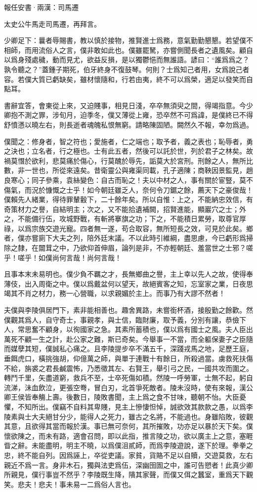 \documentclass[12pt,a4paper]{ctexbook}
\begin{document}
報任安書·兩漢：司馬遷 \par
太史公牛馬走司馬遷，再拜言。\par
少卿足下：曩者辱賜書，教以慎於接物，推賢進士爲務，意氣勤勤懇懇。若望僕不相師，而用流俗人之言，僕非敢如此也。僕雖罷駑，亦嘗側聞長者之遺風矣。顧自以爲身殘處穢，動而見尤，欲益反損，是以獨鬱悒而無誰語。諺曰：“誰爲爲之？孰令聽之？”蓋鍾子期死，伯牙終身不復鼓琴。何則？士爲知己者用，女爲說己者容。若僕大質已虧缺矣，雖材懷隨和，行若由夷，終不可以爲榮，適足以發笑而自點耳。\par
書辭宜答，會東從上來，又迫賤事，相見日淺，卒卒無須臾之間，得竭指意。今少卿抱不測之罪，涉旬月，迫季冬，僕又薄從上雍，恐卒然不可爲諱，是僕終已不得舒憤懣以曉左右，則長逝者魂魄私恨無窮。請略陳固陋。闕然久不報，幸勿爲過。\par
僕聞之：修身者，智之符也；愛施者，仁之端也；取予者，義之表也；恥辱者，勇之決也；立名者，行之極也。士有此五者，然後可以託於世，列於君子之林矣。故禍莫憯於欲利，悲莫痛於傷心，行莫醜於辱先，詬莫大於宮刑。刑餘之人，無所比數，非一世也，所從來遠矣。昔衛靈公與雍渠同載，孔子適陳；商鞅因景監見，趙良寒心；同子參乘，袁絲變色：自古而恥之！夫以中材之人，事有關於宦豎，莫不傷氣，而況於慷慨之士乎！如今朝廷雖乏人，奈何令刀鋸之餘，薦天下之豪俊哉！僕賴先人緒業，得待罪輦轂下，二十餘年矣。所以自惟：上之，不能納忠效信，有奇策材力之譽，自結明主；次之，又不能拾遺補闕，招賢進能，顯巖穴之士；外之，不能備行伍，攻城野戰，有斬將搴旗之功；下之，不能積日累勞，取尊官厚祿，以爲宗族交遊光寵。四者無一遂，苟合取容，無所短長之效，可見於此矣。鄉者，僕亦嘗廁下大夫之列，陪外廷末議。不以此時引維綱，盡思慮，今已虧形爲掃除之隸，在闒茸之中，乃欲仰首伸眉，論列是非，不亦輕朝廷、羞當世之士邪？嗟乎！嗟乎！如僕尚何言哉！尚何言哉！\par
且事本末未易明也。僕少負不羈之才，長無鄉曲之譽，主上幸以先人之故，使得奉薄伎，出入周衛之中。僕以爲戴盆何以望天，故絕賓客之知，忘室家之業，日夜思竭其不肖之材力，務一心營職，以求親媚於主上。而事乃有大謬不然者！\par
夫僕與李陵俱居門下，素非能相善也。趣舍異路，未嘗銜杯酒，接殷勤之餘歡。然僕觀其爲人，自守奇士，事親孝，與士信，臨財廉，取予義，分別有讓，恭儉下人，常思奮不顧身，以徇國家之急。其素所蓄積也，僕以爲有國士之風。夫人臣出萬死不顧一生之計，赴公家之難，斯已奇矣。今舉事一不當，而全軀保妻子之臣隨而媒孽其短，僕誠私心痛之。且李陵提步卒不滿五千，深踐戎馬之地，足歷王庭，垂餌虎口，橫挑強胡，仰億萬之師，與單于連戰十有餘日，所殺過當。虜救死扶傷不給，旃裘之君長鹹震怖，乃悉徵其左、右賢王，舉引弓之民，一國共攻而圍之。轉鬥千里，矢盡道窮，救兵不至，士卒死傷如積。然陵一呼勞軍，士無不起，躬自流涕，沬血飲泣，更張空弮，冒白刃，北首爭死敵者。陵未沒時，使有來報，漢公卿王侯皆奉觴上壽。後數日，陵敗書聞，主上爲之食不甘味，聽朝不怡。大臣憂懼，不知所出。僕竊不自料其卑賤，見主上慘悽怛悼，誠欲效其款款之愚，以爲李陵素與士大夫絕甘分少，能得人之死力，雖古之名將，不能過也。身雖陷敗，彼觀其意，且欲得其當而報於漢。事已無可奈何，其所摧敗，功亦足以暴於天下矣。僕懷欲陳之，而未有路，適會召問，即以此指，推言陵之功，欲以廣主上之意，塞睚眥之辭。未能盡明，明主不曉，以爲僕沮貳師，而爲李陵遊說，遂下於理。拳拳之忠，終不能自列。因爲誣上，卒從吏議。家貧，貨賂不足以自贖，交遊莫救，左右親近不爲一言。身非木石，獨與法吏爲伍，深幽囹圄之中，誰可告愬者！此真少卿所親見，僕行事豈不然乎？李陵既生降，隤其家聲，而僕又佴之蠶室，重爲天下觀笑。悲夫！悲夫！事未易一二爲俗人言也。\par
\end{document}
